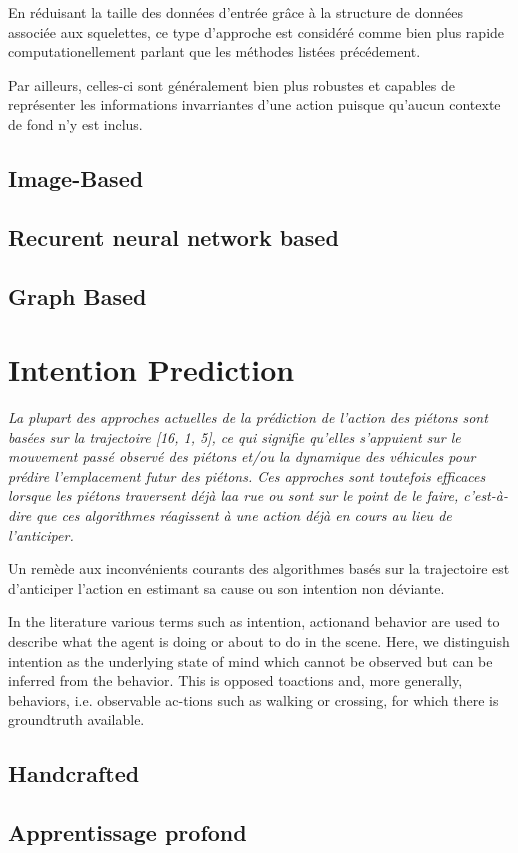 En réduisant la taille des données d'entrée grâce à la structure de données associée aux squelettes, ce type d'approche est considéré comme bien plus rapide computationellement parlant que les méthodes listées précédement.

Par ailleurs, celles-ci sont généralement bien plus robustes et capables de représenter les informations invarriantes d'une action puisque qu'aucun contexte de fond n'y est inclus.


\label{subsec:HAR}

\subsection{Image-Based}
\subsection{Recurent neural network based}
\subsection{Graph Based}

\section{Intention Prediction}
\textit{La plupart des approches actuelles de la prédiction de l'action des piétons sont basées sur la trajectoire [16, 1, 5], ce qui signifie qu'elles s'appuient sur le mouvement passé observé des piétons et/ou la dynamique des véhicules pour prédire l'emplacement futur des piétons. Ces approches sont toutefois efficaces lorsque les piétons traversent déjà laa rue ou sont sur le point de le faire, c'est-à-dire que ces algorithmes réagissent à une action déjà en cours au lieu de l'anticiper.}

Un remède aux inconvénients courants des algorithmes basés sur la trajectoire est d'anticiper l'action en estimant sa cause ou son intention non déviante.


In the literature various terms such as intention, actionand behavior are used to describe what the agent is doing or about to do in the scene. Here, we distinguish intention as the underlying state of mind which cannot be observed but can be inferred from the behavior. This is opposed toactions and, more generally, behaviors, i.e. observable ac-tions such as walking or crossing, for which there is groundtruth available.




\subsection{Handcrafted}
\subsection{Apprentissage profond}


